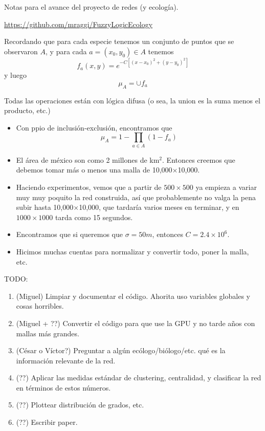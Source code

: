 \documentclass[a4paper,12pt]{article}
\begin{document}
	\begin{center}
	  Notas para el avance del proyecto de redes (y ecología).
		
		\url{https://github.com/mraggi/FuzzyLogicEcology}
	\end{center}


  Recordando que para cada especie tenemos un conjunto de puntos que se observaron $A$, y para cada $a=(x_0,y_0)\in A$ tenemos
		$$f_a(x,y) = e^{-C\left[(x-x_0)^2 + (y-y_0)^2\right]}$$
  y luego
		$$\mu_A = \cup f_a$$
	
	Todas las operaciones están con lógica difusa (o sea, la union es la suma menos el producto, etc.)
	
	\begin{itemize}
	  \item Con ppio de inclusión-exclusión, encontramos que
			$$\mu_A = 1-\prod_{a\in A} (1-f_a)$$
		\item El área de méxico son como 2 millones de km$^2$. Entonces creemos que debemos tomar más o menos una malla de 10,000$\times$10,000.
		\item Haciendo experimentos, vemos que a partir de $500\times 500$ ya empieza a variar muy muy poquito la red construida, así que probablemente no valga la pena subir hasta 10,000$\times$10,000, que tardaría varios meses en terminar, y en $1000\times 1000$ tarda como 15 segundos.
		\item Encontramos que si queremos que $\sigma = 50m$, entonces $C = 2.4\times 10^6$.
		\item Hicimos muchas cuentas para normalizar y convertir todo, poner la malla, etc.
	\end{itemize}
	
	
	
	\vspace{1cm}
	TODO:
	
	\begin{enumerate}
		\item (Miguel) Limpiar y documentar el código. Ahorita uso variables globales y cosas horribles.
		\item (Miguel + ??) Convertir el código para que use la GPU y no tarde años con mallas más grandes.
		\item (César o Víctor?) Preguntar a algún ecólogo/biólogo/etc. qué es la información relevante de la red.
		\item (??) Aplicar las medidas estándar de clustering, centralidad, y clasificar la red en términos de estos números.
		\item (??) Plottear distribución de grados, etc.
		\item (??) Escribir paper.
	\end{enumerate}
\end{document}
